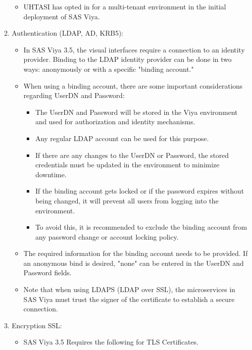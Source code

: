 \begin{enumerate}
\begin{itemize}
        \item UHTASI has opted in for a multi-tenant environment in the initial deployment of SAS Viya.
    \end{itemize}
    \item Authentication (LDAP, AD, KRB5):
    \begin{itemize}
        \item In SAS Viya 3.5, the visual interfaces require a connection to an identity provider. Binding to the LDAP identity provider can be done in two ways: anonymously or with a specific "binding account."
        \item When using a binding account, there are some important considerations regarding UserDN and Password:
        \begin{itemize}
            \item The UserDN and Password will be stored in the Viya environment and used for authorization and identity mechanisms.
            \item Any regular LDAP account can be used for this purpose.
            \item If there are any changes to the UserDN or Password, the stored credentials must be updated in the environment to minimize downtime.
            \item If the binding account gets locked or if the password expires without being changed, it will prevent all users from logging into the environment.
            \item To avoid this, it is recommended to exclude the binding account from any password change or account locking policy.
        \end{itemize}
        \item The required information for the binding account needs to be provided. If an anonymous bind is desired, "none" can be entered in the UserDN and Password fields.
        \item Note that when using LDAPS (LDAP over SSL), the microservices in SAS Viya must trust the signer of the certificate to establish a secure connection.
    \end{itemize}
    \item Encryption SSL:
    \begin{itemize}
        \item SAS Viya 3.5 Requires the following for TLS Certificates.

\end{itemize}
\end{enumerate}
